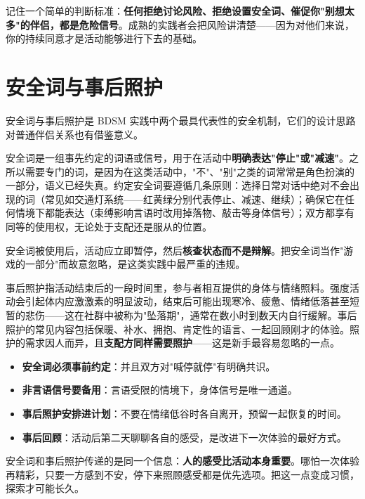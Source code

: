 \documentclass[12pt,UTF8]{ctexbook}
\newcommand{\keyword}[1]{\textbf{#1}}
\begin{document}
\begin{tcolorbox}[colback=pink!5!white,colframe=red!50!black,title=贴心小叮咛]
记住一个简单的判断标准：\keyword{任何拒绝讨论风险、拒绝设置安全词、催促你"别想太多"的伴侣，都是危险信号}。成熟的实践者会把风险讲清楚——因为对他们来说，你的持续同意才是活动能够进行下去的基础。
\end{tcolorbox}
\section{安全词与事后照护}\label{sec:aftercare}

安全词与事后照护是 BDSM 实践中两个最具代表性的安全机制，它们的设计思路对普通伴侣关系也有借鉴意义。

安全词是一组事先约定的词语或信号，用于在活动中\keyword{明确表达"停止"或"减速"}。之所以需要专门的词，是因为在这类活动中，"不"、"别"之类的词常常是角色扮演的一部分，语义已经失真。约定安全词要遵循几条原则：选择日常对话中绝对不会出现的词（常见如交通灯系统——红黄绿分别代表停止、减速、继续）；确保它在任何情境下都能表达（束缚影响言语时改用掉落物、敲击等身体信号）；双方都享有同等的使用权，无论处于支配还是服从的位置。

安全词被使用后，活动应立即暂停，然后\keyword{核查状态而不是辩解}。把安全词当作"游戏的一部分"而故意忽略，是这类实践中最严重的违规。

事后照护指活动结束后的一段时间里，参与者相互提供的身体与情绪照料。强度活动会引起体内应激激素的明显波动，结束后可能出现寒冷、疲惫、情绪低落甚至短暂的悲伤——这在社群中被称为"坠落期"，通常在数小时到数天内自行缓解。事后照护的常见内容包括保暖、补水、拥抱、肯定性的语言、一起回顾刚才的体验。照护的需求因人而异，且\keyword{支配方同样需要照护}——这是新手最容易忽略的一点。

\begin{itemize}
  \item \keyword{安全词必须事前约定}：并且双方对"喊停就停"有明确共识。
  \item \keyword{非言语信号要备用}：言语受限的情境下，身体信号是唯一通道。
  \item \keyword{事后照护安排进计划}：不要在情绪低谷时各自离开，预留一起恢复的时间。
  \item \keyword{事后回顾}：活动后第二天聊聊各自的感受，是改进下一次体验的最好方式。
\end{itemize}

\begin{tcolorbox}[colback=pink!5!white,colframe=red!50!black,title=贴心小叮咛]
安全词和事后照护传递的是同一个信息：\keyword{人的感受比活动本身重要}。哪怕一次体验再精彩，只要一方感到不安，停下来照顾感受都是优先选项。把这一点变成习惯，探索才可能长久。
\end{tcolorbox}
\end{document}

